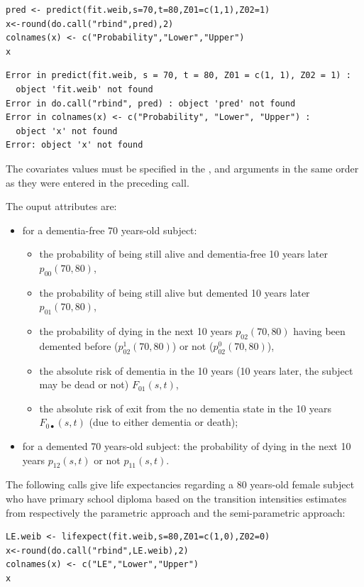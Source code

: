 \documentclass[article]{jss}
\begin{document}
\lstset{language=R,numbers=none}
\begin{lstlisting}
pred <- predict(fit.weib,s=70,t=80,Z01=c(1,1),Z02=1)
x<-round(do.call("rbind",pred),2)
colnames(x) <- c("Probability","Lower","Upper")
x
\end{lstlisting}

\begin{verbatim}
Error in predict(fit.weib, s = 70, t = 80, Z01 = c(1, 1), Z02 = 1) : 
  object 'fit.weib' not found
Error in do.call("rbind", pred) : object 'pred' not found
Error in colnames(x) <- c("Probability", "Lower", "Upper") : 
  object 'x' not found
Error: object 'x' not found
\end{verbatim}

The covariates values must be specified in the ,  and  
arguments in the same order as they were entered in the preceding  call.

The ouput attributes are:
\begin{itemize}
\item for a dementia-free 70 years-old subject: 
\begin{itemize}
\item the probability of being still alive and dementia-free 10 years later \(p_{00}(70,80)\),
\item the probability of being still alive but demented 10 years later \(p_{01}(70,80)\),
\item the probability of dying in the next 10 years \(p_{02}(70,80)\) having been demented before (\(p_{02}^1(70,80)\)) or not (\(p_{02}^0(70,80)\)),
\item the absolute risk of dementia in the 10 years (10 years later, the subject may be dead or not) \(F_{01}(s,t)\),
\item the absolute risk of exit from the no dementia state in the 10 years \(F_{0 \scriptscriptstyle{\bullet}}(s,t)\) (due to either dementia or death);
\end{itemize}
\item for a demented 70 years-old subject: the probability of dying in the next 10 years \(p_{12}(s,t)\) or not \(p_{11}(s,t)\).
\end{itemize}

The following calls give life expectancies regarding 
a 80 years-old female subject who have primary school diploma based on the 
transition intensities estimates from respectively the parametric approach 
and the semi-parametric approach:
\lstset{language=R,numbers=none}
\begin{lstlisting}
LE.weib <- lifexpect(fit.weib,s=80,Z01=c(1,0),Z02=0)
x<-round(do.call("rbind",LE.weib),2)
colnames(x) <- c("LE","Lower","Upper")
x
\end{lstlisting}
\end{document}
